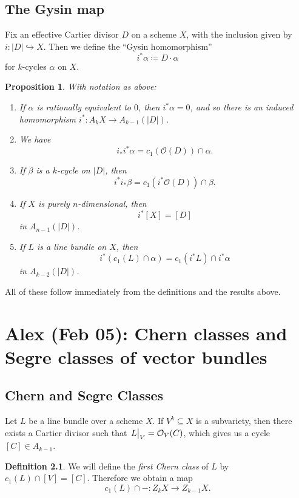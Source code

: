 \documentclass[leqno, openany]{memoir}
\newtheorem{prop}[thm]{Proposition}
\theoremstyle{definition}
\newtheorem{defn}[thm]{Definition}
\theoremstyle{remark}
\theoremstyle{plain}
\theoremstyle{definition}
\theoremstyle{remark}
\newcommand{\mc}[1]{\mathcal{#1}}
\begin{document}
\section{The Gysin map}
Fix an effective Cartier divisor $D$ on a scheme $X$, with the inclusion given by $i\colon |D| \hookrightarrow X$. Then we define the ``Gysin homomorphism'' \[ i^* \alpha \coloneqq D \cdot \alpha \] for $k$-cycles $\alpha$ on $X$.

\begin{prop}
With notation as above:
\begin{enumerate}[label=(\alph*)]
\item If $\alpha$ is rationally equivalent to $0$, then $i^* \alpha = 0$, and so there is an induced homomorphism $i^*\colon A_k X \to A_{k-1} (|D|)$.
\item We have \[ i_* i^* \alpha = c_1(\mc{O}(D)) \cap \alpha . \]
\item If $\beta$ is a $k$-cycle on $|D|$, then \[ i^* i_* \beta = c_1(i^* \mc{O}(D)) \cap \beta . \]
\item If $X$ is purely $n$-dimensional, then \[ i^* [X] = [D] \] in $A_{n-1} (|D|)$.
\item If $L$ is a line bundle on $X$, then \[ i^* (c_1(L) \cap \alpha) = c_1(i^* L) \cap i^* \alpha \] in $A_{k-2} (|D|)$.
\end{enumerate}
\end{prop}
All of these follow immediately from the definitions and the results above.

\chapter{Alex (Feb 05): Chern classes and Segre classes of vector bundles}%
\label{cha:alex_feb_05_chern_classes_and_segre_classes_of_vector_bundles}

\section{Chern and Segre Classes}%
\label{sec:chern_classes}

Let $L$ be a line bundle over a scheme $X$. If $V^k \subseteq X$ is a subvariety, then there exists a Cartier divisor such that $\eval{L}_V = \mc{O}_V(C)$, which gives us a cycle $[C] \in A_{k-1}$. 

\begin{defn}
    We will define the \textit{first Chern class} of $L$ by $c_1(L) \cap [V] = [C]$. Therefore we obtain a map
    \[ c_1(L) \cap - \colon Z_k X \to Z_{k-1} X. \]
\end{defn}
\end{document}
